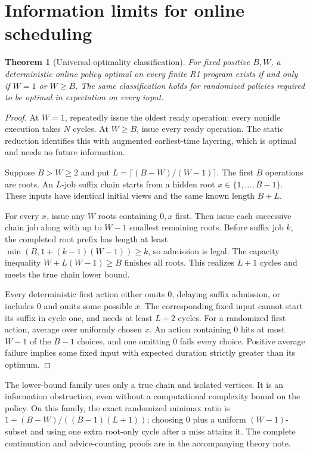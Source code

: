 \documentclass[11pt]{article}
\newtheorem{theorem}{Theorem}
\begin{document}
\section{Information limits for online scheduling}
\begin{theorem}[Universal-optimality classification]
For fixed positive $B,W$, a deterministic online policy optimal on every
finite R1 program exists if and only if $W=1$ or $W\ge B$. The same
classification holds for randomized policies required to be optimal in
expectation on every input.
\end{theorem}
\begin{proof}
At $W=1$, repeatedly issue the oldest ready operation: every nonidle
execution takes $N$ cycles. At $W\ge B$, issue every ready operation.
The static reduction identifies this with augmented earliest-time layering,
which is optimal and needs no future information.

Suppose $B>W\ge2$ and put $L=\lceil(B-W)/(W-1)\rceil$. The first $B$
operations are roots. An $L$-job suffix chain starts from a hidden root
$x\in\{1,\ldots,B-1\}$. These inputs have identical initial views and
the same known length $B+L$.

For every $x$, issue any $W$ roots containing $0,x$ first. Then issue
each successive chain job along with up to $W-1$ smallest remaining roots.
Before suffix job $k$, the completed root prefix has length at least
$\min(B,1+(k-1)(W-1))\ge k$, so admission is legal. The capacity inequality
$W+L(W-1)\ge B$ finishes all roots. This realizes $L+1$ cycles and meets
the true chain lower bound.

Every deterministic first action either omits $0$, delaying suffix admission,
or includes $0$ and omits some possible $x$. The corresponding fixed input
cannot start its suffix in cycle one, and needs at least $L+2$ cycles.
For a randomized first action, average over uniformly chosen $x$. An action
containing $0$ hits at most $W-1$ of the $B-1$ choices, and one omitting
$0$ fails every choice. Positive average failure implies some fixed input
with expected duration strictly greater than its optimum.
\end{proof}

The lower-bound family uses only a true chain and isolated vertices. It is
an information obstruction, even without a computational complexity bound
on the policy. On this family, the exact randomized minimax ratio is
$1+(B-W)/((B-1)(L+1))$; choosing $0$ plus a uniform $(W-1)$-subset and
using one extra root-only cycle after a miss attains it. The complete
continuation and advice-counting proofs are in the accompanying theory note.
\end{document}

